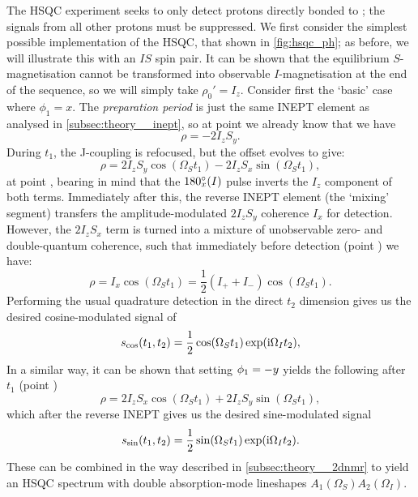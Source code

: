 The HSQC experiment seeks to only detect protons directly bonded to \carbon{}; the signals from all other protons must be suppressed.
We first consider the simplest possible implementation of the HSQC, that shown in \cref{fig:hsqc_ph}; as before, we will illustrate this with an $IS$ spin pair.
It can be shown that the equilibrium $S$-magnetisation cannot be transformed into observable $I$-magnetisation at the end of the sequence, so we will simply take $\rho_0' = I_z$.
Consider first the `basic' case where $\phi_1 = x$.
The \textit{preparation period} is just the same INEPT element as analysed in \cref{subsec:theory__inept}, so at point  we already know that we have
\begin{equation}
    \label{eq:hsqc_ph_rho_1}
    \rho = -2I_zS_y.
\end{equation}
During $t_1$, the J-coupling is refocused, but the offset evolves to give:
\begin{equation}
    \label{eq:hsqc_ph_after_t1}
    \rho = 2I_zS_y\cos(\Omega_S t_1) - 2I_zS_x \sin(\Omega_S t_1),
\end{equation}
at point , bearing in mind that the $\angang{180}{x}(I)$ pulse inverts the $I_z$ component of both terms.
Immediately after this, the reverse INEPT element (the `mixing' segment) transfers the amplitude-modulated $2I_zS_y$ coherence $I_x$ for detection.
However, the $2I_zS_x$ term is turned into a mixture of unobservable zero- and double-quantum coherence, such that immediately before detection (point ) we have:
\begin{equation}
    \label{eq:hsqc_ph_detection}
    \rho = I_x\cos(\Omega_S t_1) = \frac{1}{2}(I_+ + I_-)\cos(\Omega_S t_1).
\end{equation}
Performing the usual quadrature detection in the direct $t_2$ dimension gives us the desired cosine-modulated signal of
\begin{equation}
    \label{eq:hsqc_cos_signal}
    s_\text{cos}(t_1, t_2) = \frac{1}{2}\cos(\Omega_S t_1)\exp(\mathrm{i} \Omega_I t_2),
\end{equation}
In a similar way, it can be shown that setting $\phi_1 = -y\/$ yields the following after $t_1$ (point )
\begin{equation}
    \label{eq:hsqc_ph_after_t1_sin}
    \rho = 2I_zS_x\cos(\Omega_S t_1) + 2I_zS_y \sin(\Omega_S t_1),
\end{equation}
which after the reverse INEPT gives us the desired sine-modulated signal
\begin{equation}
    \label{eq:hsqc_sin_signal}
    s_\text{sin}(t_1, t_2) = \frac{1}{2}\sin(\Omega_S t_1)\exp(\mathrm{i} \Omega_I t_2).
\end{equation}
These can be combined in the way described in \cref{subsec:theory__2dnmr} to yield an HSQC spectrum with double absorption-mode lineshapes $A_1(\Omega_S)A_2(\Omega_I)$.

